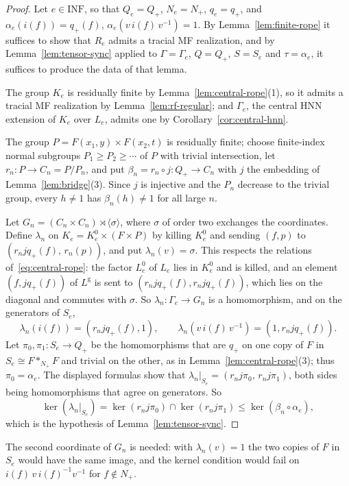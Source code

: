 \documentclass[11pt]{amsart}
\theoremstyle{remark}
\theoremstyle{plain}
\begin{document}
\begin{proof}
Let $e\in\mathrm{INF}$, so that $Q_e=Q_+$, $N_e=N_+$, $q_e=q_+$, and
$\alpha_e(i(f))=q_+(f)$, $\alpha_e(v\,i(f)\,v^{-1})=1$.  By
Lemma~\ref{lem:finite-rope} it suffices to show that $R_e$ admits a
tracial MF realization, and by Lemma~\ref{lem:tensor-sync} applied to $\Gamma=\Gamma_e$,
$Q=Q_+$, $S=S_e$ and $\tau=\alpha_e$, it suffices to produce the data of
that lemma.

The group $K_e$ is residually finite by Lemma~\ref{lem:central-rope}(1),
so it admits a tracial MF realization by Lemma~\ref{lem:rf-regular};
and $\Gamma_e$, the central HNN extension of $K_e$ over $L_e$, admits
one by Corollary~\ref{cor:central-hnn}.

The group $P=F(x_1,y)\times F(x_2,t)$ is residually finite; choose
finite-index normal subgroups $P_1\ge P_2\ge\cdots$ of $P$ with trivial
intersection, let $r_n\colon P\to C_n=P/P_n$, and put
$\beta_n=r_n\circ j\colon Q_+\to C_n$ with $j$ the embedding of
Lemma~\ref{lem:bridge}(3).  Since $j$ is injective and the $P_n$ decrease
to the trivial group, every $h\ne1$ has $\beta_n(h)\ne1$ for all large $n$.

Let $G_n=(C_n\times C_n)\rtimes\langle\sigma\rangle$, where $\sigma$ of
order two exchanges the coordinates.  Define $\lambda_n$ on
$K_e=K^0_e\times(F\times P)$ by killing $K^0_e$ and sending $(f,p)$ to
$(r_njq_+(f),\,r_n(p))$, and put $\lambda_n(v)=\sigma$.  This respects the
relations of~\eqref{eq:central-rope}: the factor $L^0_e$ of $L_e$ lies in
$K^0_e$ and is killed, and an element $(f,jq_+(f))$ of $L^{\mathrm g}$ is
sent to $(r_njq_+(f),r_njq_+(f))$, which lies on the diagonal and commutes
with $\sigma$.  So $\lambda_n\colon\Gamma_e\to G_n$ is a homomorphism,
and on the generators of $S_e$,
\[
 \lambda_n(i(f))=(r_njq_+(f),1),
 \qquad
 \lambda_n(v\,i(f)\,v^{-1})=(1,r_njq_+(f)).
\]
Let $\pi_0,\pi_1\colon S_e\to Q_+$ be the homomorphisms that are $q_+$ on
one copy of $F$ in $S_e\cong F*_{N_+}F$ and trivial on the other, as in
Lemma~\ref{lem:central-rope}(3); thus $\pi_0=\alpha_e$.  The displayed
formulas show that $\lambda_n|_{S_e}=(r_nj\pi_0,\,r_nj\pi_1)$, both sides
being homomorphisms that agree on generators.  So
\[
 \ker(\lambda_n|_{S_e})=\ker(r_nj\pi_0)\cap\ker(r_nj\pi_1)\le\ker(\beta_n\circ\alpha_e),
\]
which is the hypothesis of Lemma~\ref{lem:tensor-sync}.
\end{proof}

The second coordinate of $G_n$ is needed: with $\lambda_n(v)=1$ the two
copies of $F$ in $S_e$ would have the same image, and the kernel condition
would fail on $i(f)\,v\,i(f)^{-1}v^{-1}$ for $f\notin N_+$.
\end{document}
